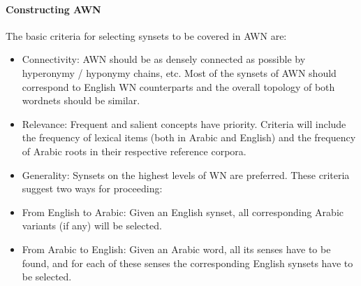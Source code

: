 \paragraph{Constructing AWN}
The basic criteria for selecting synsets to be covered in AWN are\citep{awn_2}: 
\begin{itemize}
\item Connectivity: AWN should be as densely connected as possible by hyperonymy / hyponymy chains, etc. Most of the synsets of AWN should correspond to English WN counterparts and the overall topology of both wordnets should be similar.
\item Relevance: Frequent and salient concepts have priority. Criteria will include the frequency of lexical items (both in Arabic and English) and the frequency of Arabic roots in their respective reference corpora.
\item Generality: Synsets on the highest levels of WN are preferred. These criteria suggest two ways for proceeding:
\item From English to Arabic: Given an English synset, all corresponding Arabic variants (if any) will be selected.
\item From Arabic to English: Given an Arabic word, all its senses have to be found, and for each of these senses the corresponding English synsets have to be selected.
\end{itemize}

